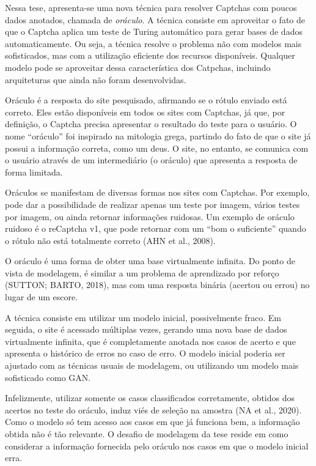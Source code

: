 \documentclass[12pt,twoside,brazilian]{book}
\begin{document}
Nessa tese, apresenta-se uma nova técnica para resolver Captchas com
poucos dados anotados, chamada de \emph{oráculo}. A técnica consiste em
aproveitar o fato de que o Captcha aplica um teste de Turing automático
para gerar bases de dados automaticamente. Ou seja, a técnica resolve o
problema não com modelos mais sofisticados, mas com a utilização
eficiente dos recursos disponíveis. Qualquer modelo pode se aproveitar
dessa característica dos Catpchas, incluindo arquiteturas que ainda não
foram desenvolvidas.

Oráculo é a resposta do site pesquisado, afirmando se o rótulo enviado
está correto. Eles estão disponíveis em todos os sites com Captchas, já
que, por definição, o Captcha precisa apresentar o resultado do teste
para o usuário. O nome ``oráculo'' foi inspirado na mitologia grega,
partindo do fato de que o site já possui a informação correta, como um
deus. O site, no entanto, se comunica com o usuário através de um
intermediário (o oráculo) que apresenta a resposta de forma limitada.

Oráculos se manifestam de diversas formas nos sites com Captchas. Por
exemplo, pode dar a possibilidade de realizar apenas um teste por
imagem, vários testes por imagem, ou ainda retornar informações
ruidosas. Um exemplo de oráculo ruidoso é o reCaptcha v1, que pode
retornar com um ``bom o suficiente'' quando o rótulo não está totalmente
correto (AHN et al., 2008).

O oráculo é uma forma de obter uma base virtualmente infinita. Do ponto
de vista de modelagem, é similar a um problema de aprendizado por
reforço (SUTTON; BARTO, 2018), mas com uma resposta binária (acertou ou
errou) no lugar de um escore.

A técnica consiste em utilizar um modelo inicial, possivelmente fraco.
Em seguida, o site é acessado múltiplas vezes, gerando uma nova base de
dados virtualmente infinita, que é completamente anotada nos casos de
acerto e que apresenta o histórico de erros no caso de erro. O modelo
inicial poderia ser ajustado com as técnicas usuais de modelagem, ou
utilizando um modelo mais sofisticado como GAN.

Infelizmente, utilizar somente os casos classificados corretamente,
obtidos dos acertos no teste do oráculo, induz viés de seleção na
amostra (NA et al., 2020). Como o modelo só tem acesso aos casos em que
já funciona bem, a informação obtida não é tão relevante. O desafio de
modelagem da tese reside em como considerar a informação fornecida pelo
oráculo nos casos em que o modelo inicial erra.
\end{document}
